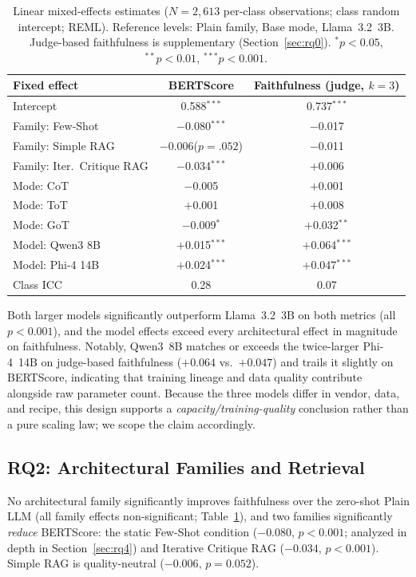 \documentclass[pdflatex,sn-mathphys-ay]{sn-jnl}%
\theoremstyle{thmstyleone}%
\theoremstyle{thmstyletwo}%
\theoremstyle{thmstylethree}%
\begin{document}
\begin{table}[h]
\centering
\small
\caption{Linear mixed-effects estimates ($N{=}2{,}613$ per-class observations; class random intercept; REML). Reference levels: Plain family, Base mode, Llama~3.2~3B. Judge-based faithfulness is supplementary (Section~\ref{sec:rq0}). $^{*}p{<}0.05$, $^{**}p{<}0.01$, $^{***}p{<}0.001$.}
\label{tab:mixedeffects}
\begin{tabular}{lcc}
\toprule
\textbf{Fixed effect} & \textbf{BERTScore} & \textbf{Faithfulness (judge, $k{=}3$)} \\
\midrule
Intercept                    & 0.588$^{***}$          & 0.737$^{***}$ \\
Family: Few-Shot             & $-$0.080$^{***}$       & $-$0.017 \\
Family: Simple RAG           & $-$0.006\;($p{=}.052$) & $-$0.011 \\
Family: Iter.\ Critique RAG  & $-$0.034$^{***}$       & $+$0.006 \\
Mode: CoT                    & $-$0.005               & $+$0.001 \\
Mode: ToT                    & $+$0.001               & $+$0.008 \\
Mode: GoT                    & $-$0.009$^{*}$         & $+$0.032$^{**}$ \\
Model: Qwen3 8B              & $+$0.015$^{***}$       & $+$0.064$^{***}$ \\
Model: Phi-4 14B             & $+$0.024$^{***}$       & $+$0.047$^{***}$ \\
\midrule
Class ICC                    & 0.28                   & 0.07 \\
\bottomrule
\end{tabular}
\end{table}

Both larger models significantly outperform Llama~3.2~3B on both metrics (all $p<0.001$), and the model effects exceed every architectural effect in magnitude on faithfulness. Notably, Qwen3~8B matches or exceeds the twice-larger Phi-4~14B on judge-based faithfulness ($+0.064$ vs.\ $+0.047$) and trails it slightly on BERTScore, indicating that training lineage and data quality contribute alongside raw parameter count. Because the three models differ in vendor, data, and recipe, this design supports a \emph{capacity/training-quality} conclusion rather than a pure scaling law; we scope the claim accordingly.

\subsection{RQ2: Architectural Families and Retrieval}
\label{sec:rq2}
No architectural family significantly improves faithfulness over the zero-shot Plain LLM (all family effects non-significant; Table~\ref{tab:mixedeffects}), and two families significantly \emph{reduce} BERTScore: the static Few-Shot condition ($-0.080$, $p<0.001$; analyzed in depth in Section~\ref{sec:rq4}) and Iterative Critique RAG ($-0.034$, $p<0.001$). Simple RAG is quality-neutral ($-0.006$, $p=0.052$).
\end{document}
